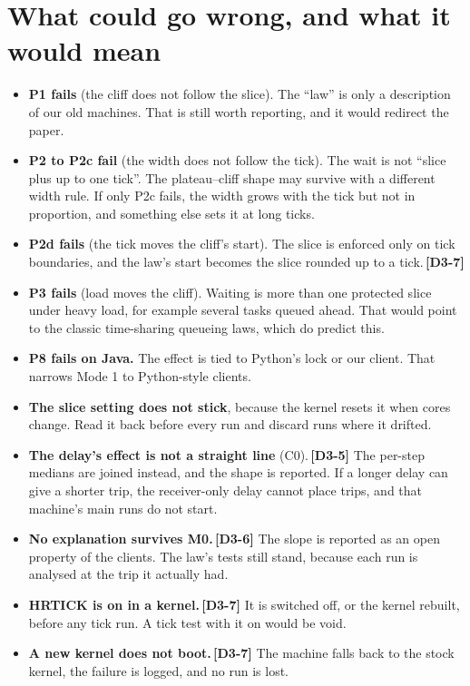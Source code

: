 \documentclass[11pt]{article}
\newcommand{\chgold}[1]{\,{\color{oldcol}\bfseries\footnotesize[#1]}}
\begin{document}
\section{What could go wrong, and what it would mean}
\begin{itemize}
  \item \textbf{P1 fails} (the cliff does not follow the slice). The ``law'' is only a description of our old machines. That is still worth reporting, and it would redirect the paper.
  \item \textbf{P2 to P2c fail} (the width does not follow the tick). The wait is not ``slice plus up to one tick''. The plateau--cliff shape may survive with a different width rule. If only P2c fails, the width grows with the tick but not in proportion, and something else sets it at long ticks.
  \item \textbf{P2d fails} (the tick moves the cliff's start). The slice is enforced only on tick boundaries, and the law's start becomes the slice rounded up to a tick.\chgold{D3-7}
  \item \textbf{P3 fails} (load moves the cliff). Waiting is more than one protected slice under heavy load, for example several tasks queued ahead. That would point to the classic time-sharing queueing laws, which do predict this.
  \item \textbf{P8 fails on Java.} The effect is tied to Python's lock or our client. That narrows Mode 1 to Python-style clients.
  \item \textbf{The slice setting does not stick}, because the kernel resets it when cores change. Read it back before every run and discard runs where it drifted.
  \item \textbf{The delay's effect is not a straight line} (C0).\chgold{D3-5} The per-step medians are joined instead, and the shape is reported. If a longer delay can give a shorter trip, the receiver-only delay cannot place trips, and that machine's main runs do not start.
  \item \textbf{No explanation survives M0.}\chgold{D3-6} The slope is reported as an open property of the clients. The law's tests still stand, because each run is analysed at the trip it actually had.
  \item \textbf{HRTICK is on in a kernel.}\chgold{D3-7} It is switched off, or the kernel rebuilt, before any tick run. A tick test with it on would be void.
  \item \textbf{A new kernel does not boot.}\chgold{D3-7} The machine falls back to the stock kernel, the failure is logged, and no run is lost.

\end{itemize}
\end{document}
